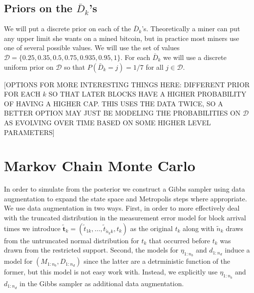 \documentclass{article}
\begin{document}
\subsection{Priors on the $\bar{D}_k$'s}
We will put a discrete prior on each of the $\bar{D}_k$'s. Theoretically a miner can put any upper limit she wants on a mined bitcoin, but in practice most miners use one of several possible values. We will use the set of values $\mathcal{D} = \{0.25, 0.35, 0.5, 0.75, 0.935, 0.95, 1\}$. For each $\bar{D}_k$ we will use a discrete uniform prior on $\mathcal{D}$ so that $P(\bar{D}_k = j) = 1/7$ for all $j \in \mathcal{D}$.

[OPTIONS FOR MORE INTERESTING THINGS HERE: DIFFERENT PRIOR FOR EACH $k$ SO THAT LATER BLOCKS HAVE A HIGHER PROBABILITY OF HAVING A HIGHER CAP. THIS USES THE DATA TWICE, SO A BETTER OPTION MAY JUST BE MODELING THE PROBABILITIES ON $\mathcal{D}$ AS EVOLVING OVER TIME BASED ON SOME HIGHER LEVEL PARAMETERS]

\section{Markov Chain Monte Carlo}\label{sec:mcmc}

In order to simulate from the posterior we construct a Gibbs sampler using data augmentation to expand the state space and Metropolis steps where appropriate. We use data augmentation in two ways. First, in order to more effectively deal with the truncated distribution in the measurement error model for block arrival times we introduce $\tilde{\bm{t}}_k=(\tilde{t}_{1k},\dots,\tilde{t}_{\tilde{n}_kk}, t_k)$ as the original $t_k$ along with $\tilde{n}_k$ draws from the untruncated normal distribution for $t_k$ that occurred before $t_k$ was drawn from the restricted support. Second, the models for $\eta_{1:n_{b}}$ and $d_{1:n_d}$ induce a model for $(M_{1:n_{b}},D_{1:n_d})$ since the latter are a detrministic function of the former, but this model is not easy work with. Instead, we explicitly use $\eta_{1:n_{b}}$ and $d_{1:n_d}$ in the Gibbs sampler as additional data augmentation.
\end{document}
